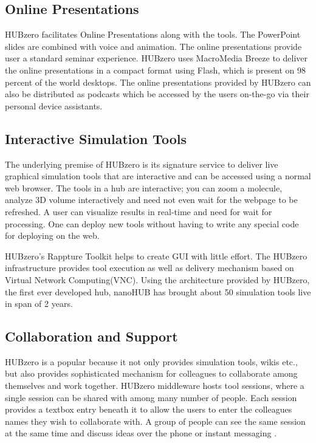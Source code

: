 \documentclass[9pt,twocolumn,twoside]{../../styles/osajnl}
\begin{document}
\subsection{Online Presentations}
HUBzero facilitates Online Presentations along with the tools. The
PowerPoint slides are combined with voice and animation. The online
presentations provide user a standard seminar experience. HUBzero uses
MacroMedia Breeze to deliver the online presentations in a compact
format using Flash, which is present on 98 percent of the world
desktops. The online presentations provided by HUBzero can also be
distributed as podcasts which be accessed by the users on-the-go via
their personal device assistants\cite{hubzerofeatures}.

\subsection{Interactive Simulation Tools}
The underlying premise of HUBzero is its signature service to deliver
live graphical simulation tools that are interactive and can be
accessed using a normal web browser. The tools in a hub are
interactive; you can zoom a molecule, analyze 3D volume interactively
and need not even wait for the webpage to be refreshed. A user can
visualize results in real-time and need for wait for processing. One
can deploy new tools without having to write any special code for
deploying on the web\cite{hubzerofeatures}.

HUBzero's Rappture Toolkit helps to create GUI with little effort. The
HUBzero infrastructure provides tool execution as well as delivery
mechanism based on Virtual Network Computing(VNC). Using the
architecture provided by HUBzero, the first ever developed hub,
nanoHUB has brought about 50 simulation tools live in span of 2 years.

\subsection{Collaboration and Support}
HUBzero is a popular because it not only provides simulation tools,
wikis etc., but also provides sophisticated mechanism for colleagues
to collaborate among themselves and work together. HUBzero middleware
hosts tool sessions, where a single session can be shared with among
many number of people. Each session provides a textbox entry beneath
it to allow the users to enter the colleagues names they wish to
collaborate with.  A group of people can see the same session at the
same time and discuss ideas over the phone or instant messaging \cite{hubzerofeatures}.
\end{document}
